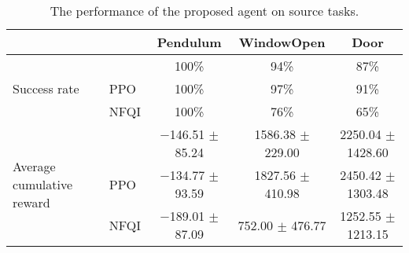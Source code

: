 \begin{landscape}
  \begin{table}[H]
    \caption{The performance of the proposed agent on source tasks.} \label{ch:DTAIL:tab:Result_SuccessRate_Before_Source}

    \begin{tabular}{llccc}
      \toprule
                                    &                           & \textbf{Pendulum}     & \textbf{WindowOpen}  & \textbf{Door}         \\
      \midrule
      \multirow{3}{*}{Success rate} & \DTAIL{}                  & 100\%                 & 94\%                 & 87\%                  \\
                                    & PPO \cite{Baseline_PPO}   & 100\%                 & 97\%                 & 91\%                  \\
                                    & NFQI \cite{Baseline_NFQI} & 100\%                 & 76\%                 & 65\%                  \\
      \midrule
      \multirow{3}{*}{Average cumulative reward}
                                    & \DTAIL{}                  & $-$146.51 $\pm$ 85.24 & 1586.38 $\pm$ 229.00 & 2250.04 $\pm$ 1428.60 \\
                                    & PPO \cite{Baseline_PPO}   & $-$134.77 $\pm$ 93.59 & 1827.56 $\pm$ 410.98 & 2450.42 $\pm$ 1303.48 \\
                                    & NFQI \cite{Baseline_NFQI} & $-$189.01 $\pm$ 87.09 & 752.00 $\pm$ 476.77  & 1252.55 $\pm$ 1213.15 \\
      \bottomrule
    \end{tabular}
  \end{table}








\end{landscape}
